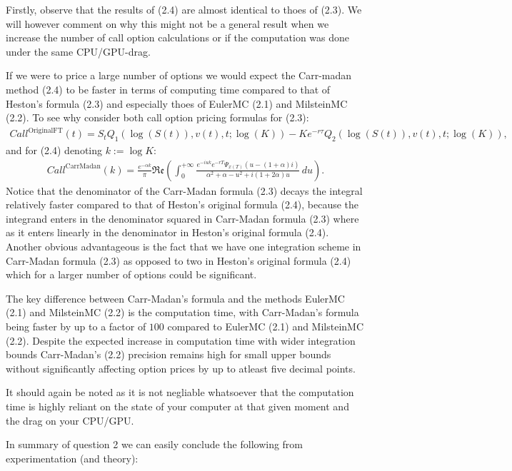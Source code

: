 \documentclass[11pt]{article}
\numberwithin{equation}{section}
\begin{document}
Firstly, observe that the results of (2.4) are almost identical to thoes of
(2.3). We will however comment on why this might not be a general result when we
increase the number of call option calculations or if the computation was done
under the same CPU/GPU-drag.

If we were to price a large number of options we would expect the
Carr-madan method (2.4) to be faster in terms of computing time
compared to that of Heston's formula (2.3) and especially thoes of EulerMC (2.1) and MilsteinMC
(2.2). To see why consider both call option pricing formulas for (2.3):
\begin{align*}
    Call^{\text{OriginalFT}}(t)=S_tQ_1(\log(S(t)),v(t),t;\log(K))-Ke^{-r\tau}Q_2(\log(S(t)),v(t),t;\log(K)),
\end{align*}
and for (2.4) denoting $k:=\log K$:
\begin{align*}
    Call^{\text{CarrMadan}}(k) = \frac{e^{-\alpha k}}{\pi} \mathfrak{Re} \left( \int_{0}^{+\infty} \frac{e^{-iu k} e^{-rT} \Psi_{x(T)}\left(u - (1 + \alpha)i\right)}{\alpha^{2} + \alpha - u^{2} + i(1 + 2\alpha)u} \, du \right).
\end{align*}
Notice that the denominator of the Carr-Madan formula (2.3) decays the integral
relatively faster compared to that of Heston's original formula (2.4), because the integrand enters in the denominator squared in Carr-Madan formula (2.3)
where as it enters linearly in the denominator in Heston's original formula
(2.4). Another obvious advantageous is the fact that we have one integration
scheme in Carr-Madan formula (2.3) as opposed to two in Heston's original formula
(2.4) which for a larger number of options could be significant.

The key difference between Carr-Madan's formula and the methods EulerMC (2.1)
and MilsteinMC (2.2)  is the computation time, with Carr-Madan's formula being
faster by up to a factor of $100$ compared to EulerMC (2.1) and MilsteinMC (2.2). Despite the expected
increase in computation time with wider integration bounds Carr-Madan's (2.2) precision remains high for small
upper bounds without significantly affecting option prices by up to atleast five
decimal points.

It should again be noted as it is not negliable whatsoever that the computation time is highly
reliant on the state of your computer at that given moment and the drag on your
CPU/GPU.

In summary of question 2 we can easily conclude the following from
experimentation (and theory):
\end{document}
